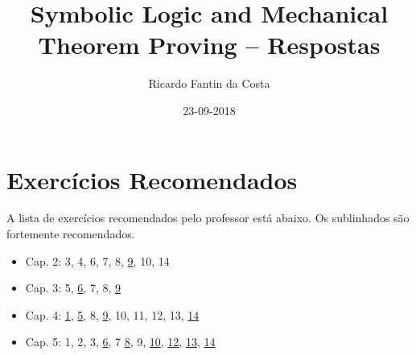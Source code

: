 \documentclass[a4paper,10pt]{article}
\title{Symbolic Logic and Mechanical Theorem Proving -- Respostas}
\author{Ricardo Fantin da Costa}
\date{23-09-2018}
\begin{document}
\maketitle

\section{Exercícios Recomendados}
A lista de exercícios recomendados pelo professor está abaixo. Os sublinhados são fortemente recomendados.

\begin{itemize}
 \item Cap. 2: 3, 4, 6, 7, 8, \underline{9}, 10, 14
 \item Cap. 3: 5, \underline{6}, 7, 8, \underline{9}
 \item Cap. 4: \underline{1}, \underline{5}, 8, \underline{9}, 10, 11, 12, 13, \underline{14}
 \item Cap. 5: 1, 2, 3, \underline{6}, 7 \underline{8}, 9, \underline{10}, \underline{12}, \underline{13}, \underline{14}
\end{itemize}





\end{document}
